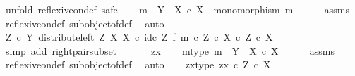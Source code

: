 \begin{isabellebody}
%
\isadelimproof
%
\endisadelimproof
%
\isatagproof
{}\isamarkupfalse%
\ {\isacharparenleft}{\kern0pt}unfold\ reflexive{\isacharunderscore}{\kern0pt}on{\isacharunderscore}{\kern0pt}def{\isacharcomma}{\kern0pt}\ safe{\isacharparenright}{\kern0pt}\isanewline
\ \ \isamarkupfalse%
\ {\isachardoublequoteopen}m\ {\isacharcolon}{\kern0pt}\ Y\ {\isasymrightarrow}\ X\ {\isasymtimes}\isactrlsub c\ X\ {\isasymand}\ monomorphism\ m{\isachardoublequoteclose}\isanewline
\ \ \ \ \isamarkupfalse%
\ assms\ \isamarkupfalse%
\ reflexive{\isacharunderscore}{\kern0pt}on{\isacharunderscore}{\kern0pt}def\ subobject{\isacharunderscore}{\kern0pt}of{\isacharunderscore}{\kern0pt}def{}\ \isamarkupfalse%
\ auto\isanewline
\ \ \isamarkupfalse%
\ \isamarkupfalse%
\ {\isachardoublequoteopen}{\isacharparenleft}{\kern0pt}Z\ {\isasymtimes}\isactrlsub c\ Y{\isacharcomma}{\kern0pt}\ distribute{\isacharunderscore}{\kern0pt}left\ Z\ X\ X\ {\isasymcirc}\isactrlsub c\ {\isacharparenleft}{\kern0pt}id\isactrlsub c\ Z\ {\isasymtimes}\isactrlsub f\ m{\isacharparenright}{\kern0pt}{\isacharparenright}{\kern0pt}\ {\isasymsubseteq}\isactrlsub c\ {\isacharparenleft}{\kern0pt}Z\ {\isasymtimes}\isactrlsub c\ X{\isacharparenright}{\kern0pt}\ {\isasymtimes}\isactrlsub c\ Z\ {\isasymtimes}\isactrlsub c\ X{\isachardoublequoteclose}\isanewline
\ \ \ \ \isamarkupfalse%
\ {\isacharparenleft}{\kern0pt}simp\ add{\isacharcolon}{\kern0pt}\ right{\isacharunderscore}{\kern0pt}pair{\isacharunderscore}{\kern0pt}subset{\isacharparenright}{\kern0pt}\isanewline
\ \ \isamarkupfalse%
\isanewline
\ \ \isamarkupfalse%
\ zx\isanewline
\ \ \isamarkupfalse%
\ m{\isacharunderscore}{\kern0pt}type{\isacharcolon}{\kern0pt}\ {\isachardoublequoteopen}m\ {\isacharcolon}{\kern0pt}\ Y\ {\isasymrightarrow}\ X\ {\isasymtimes}\isactrlsub c\ X{\isachardoublequoteclose}\isanewline
\ \ \ \ \isamarkupfalse%
\ assms\ \isamarkupfalse%
\ reflexive{\isacharunderscore}{\kern0pt}on{\isacharunderscore}{\kern0pt}def\ subobject{\isacharunderscore}{\kern0pt}of{\isacharunderscore}{\kern0pt}def{}\ \isamarkupfalse%
\ auto\isanewline
\ \ \isamarkupfalse%
\ zx{\isacharunderscore}{\kern0pt}type{\isacharcolon}{\kern0pt}\ {\isachardoublequoteopen}zx\ {\isasymin}\isactrlsub c\ Z\ {\isasymtimes}\isactrlsub c\ X{\isachardoublequoteclose}\isanewline
\ \ \isamarkupfalse%

\end{isabellebody}
